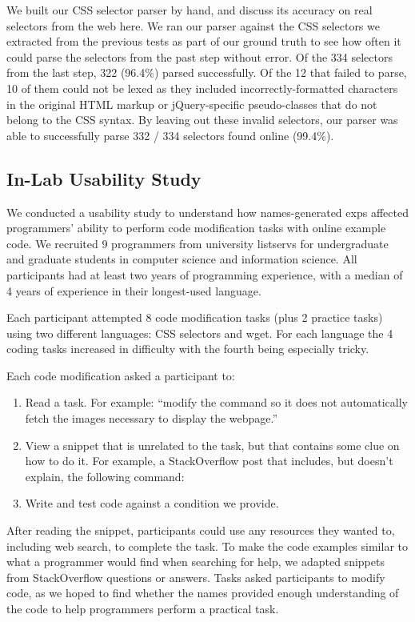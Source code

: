 \begin{changes}
We built our CSS selector parser by hand, and discuss its accuracy on real selectors from the web here.
We ran our parser against the CSS selectors we extracted from the previous tests as part of our ground truth to see how often it could parse the selectors from the past step without error.
Of the 334 selectors from the last step, 322 (96.4\%) parsed successfully.
Of the 12 that failed to parse, 10 of them could not be lexed as they included incorrectly-formatted characters in the original HTML markup or jQuery-specific pseudo-classes that do not belong to the CSS syntax.
By leaving out these invalid selectors, our parser was able to successfully parse 332 / 334 selectors found online (99.4\%).

\end{changes}

\subsection{In-Lab Usability Study}

We conducted a usability study to understand how \Glspl{name}-generated \glspl{exp} affected programmers' ability to perform code modification tasks with online example code.
We recruited 9 programmers from university listservs for undergraduate and graduate students in computer science and information science.
All participants had at least two years of programming experience, with a median of 4 years of experience in their longest-used language.

Each participant attempted 8 code modification tasks (plus 2 practice tasks) using two different languages: CSS selectors and wget.
For each language the 4 coding tasks increased in difficulty with the fourth being especially tricky.

\begin{changes}
Each code modification asked a participant to:
\begin{enumerate}
\item Read a task.  For example: ``modify the command so it does not automatically fetch the images necessary to display the webpage.''
\item View a snippet that is unrelated to the task, but that contains some clue on how to do it.  For example, a StackOverflow post that includes, but doesn't explain, the following command:
\vspace{.2em}
\vspace{.2em}
\item Write and test code against a condition we provide.
\end{enumerate}

After reading the snippet, participants could use any resources they wanted to, including web search, to complete the task.
To make the code examples similar to what a programmer would find when searching for help, we adapted snippets from StackOverflow questions or answers.
Tasks asked participants to modify code, as we hoped to find whether the \Glspl{name} provided enough understanding of the code to help programmers perform a practical task.
\end{changes}

